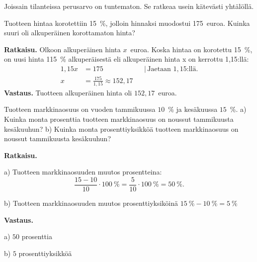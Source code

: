 Joissain tilanteissa perusarvo on tuntematon. Se ratkeaa usein kätevästi yhtälöllä.
\begin{esimerkki}
Tuotteen hintaa korotettiin 15~\%, jolloin hinnaksi muodostui 175~euroa. Kuinka suuri oli alkuperäinen korottamaton hinta?

\textbf{Ratkaisu.} 
Olkoon alkuperäinen hinta $x$~euroa. Koska hintaa on korotettu 15~\%, on uusi hinta 115~\% alkuperäisestä eli alkuperäinen hinta x on kerrottu 1,15:llä:
\begin{align*}
	1,15x	&= 175	&	&|\, \text{Jaetaan $1,15$:llä.} \\
	x	&= \frac{175}{1,15} \approx 152,17
\end{align*}
    \textbf{Vastaus.}
    Tuotteen alkuperäinen hinta oli $152,17$~euroa.
\end{esimerkki}


\begin{esimerkki}
    Tuotteen markkinaosuus on vuoden tammikuussa $10$~\% ja kesäkuussa $15$~\%.
    a) Kuinka monta prosenttia tuotteen markkinaosuus on noussut tammikuusta kesäkuuhun?
    b) Kuinka monta prosenttiyksikköä tuotteen markkinaosuus on noussut tammikuusta kesäkuuhun?

    \textbf{Ratkaisu.}
    
a) Tuotteen markkinaosuuden muutos prosentteina:
          \[
                \frac{15-10}{10} \cdot 100~\%= \frac{5}{10}\cdot 100~\% = 50~\%.
          \]
  
b) Tuotteen markkinaosuuden muutos prosenttiyksiköinä $15~\%-10~\%=5~\%$

\textbf{Vastaus.}

a) $50$ prosenttia

b) $5$ prosenttiyksikköä
\end{esimerkki}
